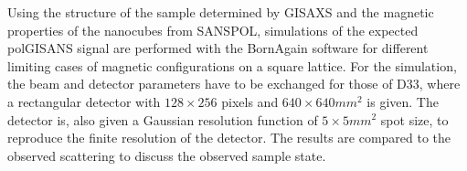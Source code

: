 \documentclass[\main/dresen_thesis.tex]{subfiles}
\begin{document}
    Using the structure of the sample determined by GISAXS and the magnetic properties of the nanocubes from SANSPOL, simulations of the expected polGISANS signal are performed with the BornAgain software \cite{Burle_2018_borna} for different limiting cases of magnetic configurations on a square lattice.
    For the simulation, the beam and detector parameters have to be exchanged for those of D33, where a rectangular detector with $128 \times 256$ pixels and $640 \times 640 \unit{mm}^2$ is given.
    The detector is, also given a Gaussian resolution function of $5 \times 5 \unit{mm^2}$ spot size, to reproduce the finite resolution of the detector.
    The results are compared to the observed scattering to discuss the observed sample state.
\end{document}

